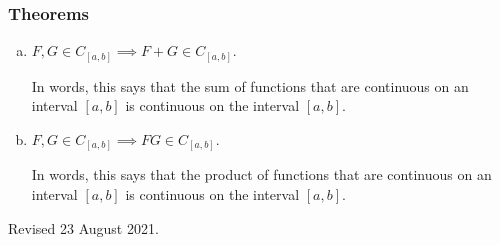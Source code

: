 \documentclass[12pt]{article}
\newenvironment{alphalist}{
  \begin{enumerate}[(a)]
    \addtolength{\itemsep}{-0.5\itemsep}}
  {\end{enumerate}}
\begin{document}
\subsubsection*{Theorems}

\begin{alphalist}  


\item $F, G \in C_{[a,b]}  \implies F+G \in C_{[a,b]}$. 

In words, this says that the sum of  functions that are continuous on an
interval $[a,b]$ is continuous on the interval $[a,b]$.

\item $F, G \in C_{[a,b]} \implies F G \in C_{[a,b]}$. 

In words, this says that the product of  functions that are continuous on an
interval $[a,b]$ is  continuous on the interval $[a,b]$.

\end{alphalist}

\noindent Revised 23 August 2021. 
\end{document}
